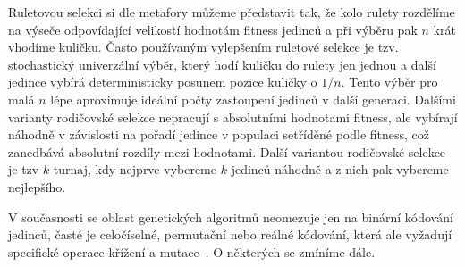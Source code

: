 Ruletovou selekci si dle metafory můžeme představit tak, že kolo rulety rozdělíme na výseče odpovídající velikostí hodnotám fitness jedinců a při výběru pak $n$ krát vhodíme kuličku. Často používaným vylepšením ruletové selekce je tzv. stochastický univerzální výběr, který hodí kuličku do rulety jen jednou a další jedince vybírá deterministicky posunem pozice kuličky o $1/n$. Tento výběr pro malá $n$ lépe aproximuje ideální počty zastoupení jedinců v další generaci. Dalšími varianty rodičovské selekce nepracují s absolutními hodnotami fitness, ale vybírají náhodně v závislosti na pořadí jedince v populaci setříděné podle fitness, což zanedbává absolutní rozdíly mezi hodnotami. Další variantou rodičovské selekce je tzv $k$-turnaj, kdy nejprve vybereme $k$ jedinců náhodně a z nich pak vybereme nejlepšího. 

V současnosti se oblast genetických algoritmů neomezuje jen na binární kódování jedinců, časté je celočíselné, permutační nebo reálné kódování, která ale vyžadují specifické operace křížení a mutace~\cite{Michalewicz:1996, Mitchell:1996}. O některých se zmíníme dále. 
